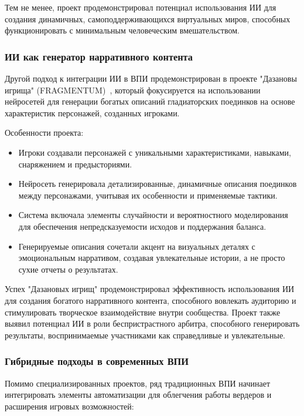 Тем не менее, проект продемонстрировал потенциал использования ИИ для создания динамичных, самоподдерживающихся виртуальных миров, способных функционировать с минимальным человеческим вмешательством.

\subsubsection{ИИ как генератор нарративного контента}

Другой подход к интеграции ИИ в ВПИ продемонстрирован в проекте "{}Дазановы игрища"{} (FRAGMENTUM)~\cite{fragmentum}, который фокусируется на использовании нейросетей для генерации богатых описаний гладиаторских поединков на основе характеристик персонажей, созданных игроками.

Особенности проекта:

\begin{itemize}
    \item Игроки создавали персонажей с уникальными характеристиками, навыками, снаряжением и предысториями.

    \item Нейросеть генерировала детализированные, динамичные описания поединков между персонажами, учитывая их особенности и применяемые тактики.

    \item Система включала элементы случайности и вероятностного моделирования для обеспечения непредсказуемости исходов и поддержания баланса.

    \item Генерируемые описания сочетали акцент на визуальных деталях с эмоциональным нарративом, создавая увлекательные истории, а не просто сухие отчеты о результатах.
\end{itemize}

Успех "{}Дазановых игрищ"{} продемонстрировал эффективность использования ИИ для создания богатого нарративного контента, способного вовлекать аудиторию и стимулировать творческое взаимодействие внутри сообщества. Проект также выявил потенциал ИИ в роли беспристрастного арбитра, способного генерировать результаты, воспринимаемые участниками как справедливые и увлекательные.

\subsubsection{Гибридные подходы в современных ВПИ}

Помимо специализированных проектов, ряд традиционных ВПИ начинает интегрировать элементы автоматизации для облегчения работы вердеров и расширения игровых возможностей:

